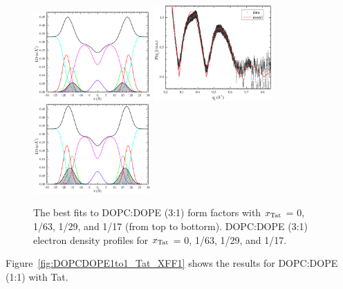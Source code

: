 \begin{figure}[htbp]
  \includegraphics[width=0.4\textwidth]{./figures/Tat/SDP_Results/EDP/DOPCDOPE3to1_Tat_28to1_3p0_EDP1}
  \includegraphics[width=0.4\textwidth]{figures/Tat/SDP_Results/XFF/DOPCDOPE3to1_Tat_16to1_3p0_XFF1}
  \includegraphics[width=0.4\textwidth]{./figures/Tat/SDP_Results/EDP/DOPCDOPE3to1_Tat_16to1_3p0_EDP1}
  \caption{The best fits to DOPC:DOPE (3:1) form factors with 
  $x_\textrm{Tat}$ = 0, 1/63, 1/29, and 1/17 (from top to bottorm). 
  DOPC:DOPE (3:1) electron density profiles for $x_\textrm{Tat}$ = 0, 1/63,
  1/29, and 1/17.}
  \label{fig:DOPCDOPE3to1_Tat_XFF1}
\end{figure}
Figure~\ref{fig:DOPCDOPE1to1_Tat_XFF1} shows the results for DOPC:DOPE (1:1)
with Tat.
